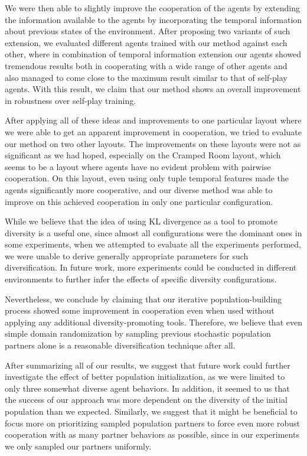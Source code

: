 We were then able to slightly improve the cooperation of the agents by extending the information available to the agents by incorporating the temporal information about previous states of the environment.
After proposing two variants of such extension, we evaluated different agents trained with our method against each other, where in combination of temporal information extension our agents showed tremendous results both in cooperating with a wide range of other agents and also managed to come close to the maximum result similar to that of self-play agents.
With this result, we claim that our method shows an overall improvement in robustness over self-play training.

After applying all of these ideas and improvements to one particular layout where we were able to get an apparent improvement in cooperation, we tried to evaluate our method on two other layouts.
The improvements on these layouts were not as significant as we had hoped, especially on the Cramped Room layout, which seems to be a layout where agents have no evident problem with pairwise cooperation.
On this layout, even using only tuple temporal features made the agents significantly more cooperative, and our diverse method was able to improve on this achieved cooperation in only one particular configuration.

While we believe that the idea of using KL divergence as a tool to promote diversity is a useful one, since almost all configurations were the dominant ones in some experiments, when we attempted to evaluate all the experiments performed, we were unable to derive generally appropriate parameters for such diversification.
In future work, more experiments could be conducted in different environments to further infer the effects of specific diversity configurations.

Nevertheless, we conclude by claiming that our iterative population-building process showed some improvement in cooperation even when used without applying any additional diversity-promoting tools.
Therefore, we believe that even simple domain randomization by sampling previous stochastic population partners alone is a reasonable diversification technique after all.

After summarizing all of our results, we suggest that future work could further investigate the effect of better population initialization, as we were limited to only three somewhat diverse agent behaviors.
In addition, it seemed to us that the success of our approach was more dependent on the diversity of the initial population than we expected.
Similarly, we suggest that it might be beneficial to focus more on prioritizing sampled population partners to force even more robust cooperation with as many partner behaviors as possible, since in our experiments we only sampled our partners uniformly.


